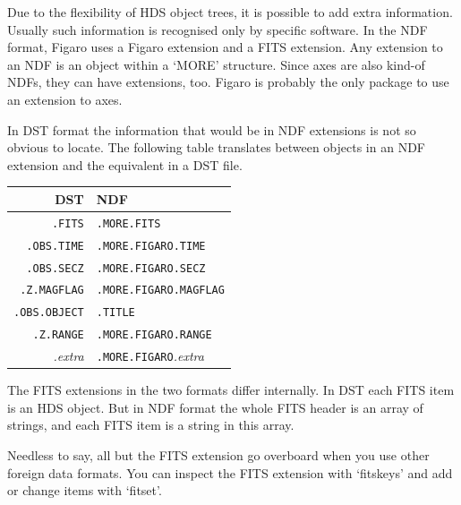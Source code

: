    Due to the flexibility of HDS object trees, it is possible to add
   extra information. Usually such information is recognised only by
   specific software. In the NDF format, Figaro uses a Figaro extension
   and a FITS extension. Any extension to an NDF is an object within a
   `MORE' structure. Since axes are also kind-of NDFs, they can have
   extensions, too. Figaro is probably the only package to use an
   extension to axes.

   In DST format the information that would be in NDF extensions is not
   so obvious to locate. The following table translates between objects
   in an NDF extension and the equivalent in a DST file.

\begin{center}
\begin{tabular}{rl}
DST & NDF \\ \hline
{\tt .FITS}       & {\tt .MORE.FITS} \\
{\tt .OBS.TIME}   & {\tt .MORE.FIGARO.TIME} \\
{\tt .OBS.SECZ}   & {\tt .MORE.FIGARO.SECZ} \\
{\tt .Z.MAGFLAG}  & {\tt .MORE.FIGARO.MAGFLAG} \\
{\tt .OBS.OBJECT} & {\tt .TITLE} \\
{\tt .Z.RANGE}    & {\tt .MORE.FIGARO.RANGE} \\
{\it .extra}      & {\tt .MORE.FIGARO}{\it .extra} \\
\end{tabular}
\end{center}

%

   The FITS extensions in the two formats differ internally. In DST each
   FITS item is an HDS object. But in NDF format the whole FITS header
   is an array of strings, and each FITS item is a string in this array.

   Needless to say, all but the FITS extension go overboard when
   you use other foreign data formats. You can inspect the FITS
   extension with `fitskeys' and add or change items with `fitset'.

